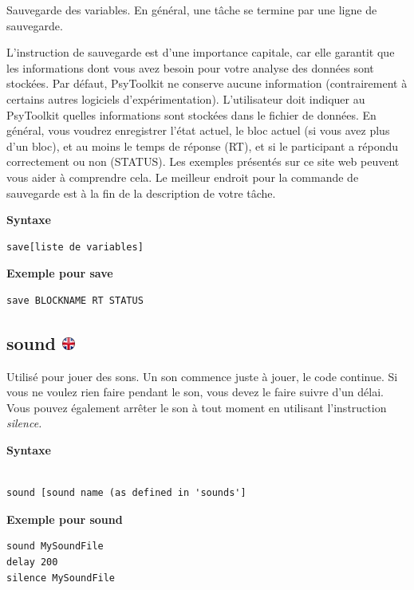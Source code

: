 \documentclass[
]{book}
\begin{document}
Sauvegarde des variables. En général, une tâche se termine par une ligne
de sauvegarde.

L'instruction de sauvegarde est d'une importance capitale, car elle
garantit que les informations dont vous avez besoin pour votre analyse
des données sont stockées. Par défaut, PsyToolkit ne conserve aucune
information (contrairement à certains autres logiciels
d'expérimentation). L'utilisateur doit indiquer au PsyToolkit quelles
informations sont stockées dans le fichier de données. En général, vous
voudrez enregistrer l'état actuel, le bloc actuel (si vous avez plus
d'un bloc), et au moins le temps de réponse (RT), et si le participant a
répondu correctement ou non (STATUS). Les exemples présentés sur ce site
web peuvent vous aider à comprendre cela. Le meilleur endroit pour la
commande de sauvegarde est à la fin de la description de votre tâche.

\textbf{Syntaxe}

\begin{verbatim}
save[liste de variables]
\end{verbatim}

\textbf{Exemple pour save}

\begin{verbatim}
save BLOCKNAME RT STATUS
\end{verbatim}

\hypertarget{sound}{%
\subsection[sound ]{\texorpdfstring{sound
\href{https://www.psytoolkit.org/doc3.2.0/syntax.html\#task-sound}{\protect\includegraphics{img/ukflag.png}}}{sound }}\label{sound}}

Utilisé pour jouer des sons. Un son commence juste à jouer, le code
continue. Si vous ne voulez rien faire pendant le son, vous devez le
faire suivre d'un délai. Vous pouvez également arrêter le son à tout
moment en utilisant l'instruction \emph{silence.}

\textbf{Syntaxe}

\begin{verbatim}

sound [sound name (as defined in 'sounds']
\end{verbatim}

\textbf{Exemple pour sound}

\begin{verbatim}
sound MySoundFile
delay 200
silence MySoundFile
\end{verbatim}
\end{document}
